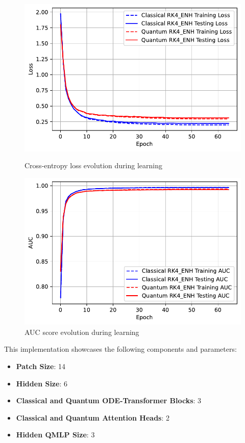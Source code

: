 \documentclass[12pt,a4paper]{report}
\begin{document}
\begin{figure}[th]
  \centering
  \includegraphics[scale=0.88]{./pics/new_pdf_graphs/hybrid/alternative_hybrid_transfomer_loss_mnist_rk4_enh.pdf}
  \caption[Cross-entropy loss evolution during learning]{Cross-entropy loss evolution during learning}
  \label{fig:p26}
  \vspace*{\floatsep}
  \centering
  \includegraphics[scale=0.88]{./pics/new_pdf_graphs/hybrid/hybrid_auc_mnist_rk4.pdf}
  \caption[AUC score evolution during learning]{AUC score evolution during learning}
  \label{fig:p27}
\end{figure}

This implementation showcases the following components and parameters:
\begin{itemize}
  \item \textbf{Patch Size}: 14
  \item \textbf{Hidden Size}: 6
  \item \textbf{Classical and Quantum ODE-Transformer Blocks}: 3
  \item \textbf{Classical and Quantum Attention Heads}: 2
  \item \textbf{Hidden QMLP Size}: 3
\end{itemize}
\end{document}
